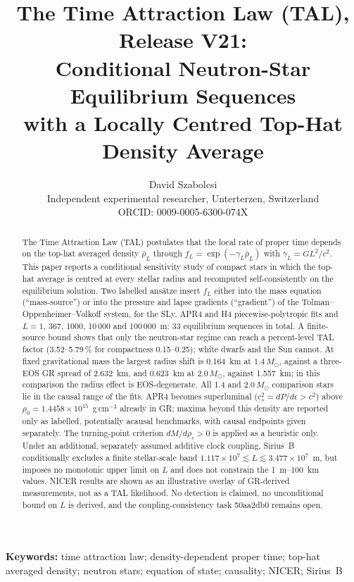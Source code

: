 \documentclass[11pt,a4paper]{article}
\title{\textbf{The Time Attraction Law (TAL), Release V21:\\
Conditional Neutron-Star Equilibrium Sequences\\
with a Locally Centred Top-Hat Density Average}}
\author{David Szabolcsi\\[2pt]
\small Independent experimental researcher, Unterterzen, Switzerland\\[2pt]
\small ORCID: 0009-0005-6300-074X}
\date{}
\newcommand{\Msun}{M_\odot}
\newcommand{\ee}[2]{#1\times10^{#2}}
\begin{document}
\maketitle
\linenumbers

\begin{abstract}
\noindent The Time Attraction Law (TAL) postulates that the local rate of proper time depends on the
top-hat averaged density $\bar\rho_L$ through $f_L=\exp(-\gamma_L\bar\rho_L)$ with $\gamma_L=GL^2/c^2$.
This paper reports a conditional sensitivity study of compact stars in which the top-hat average is
centred at every stellar radius and recomputed self-consistently on the equilibrium solution. Two
labelled ans\"atze insert $f_L$ either into the mass equation (``mass-source'') or into the pressure
and lapse gradients (``gradient'') of the Tolman--Oppenheimer--Volkoff system, for the SLy, APR4 and H4
piecewise-polytropic fits and $L=1$, 367, 1000, 10\,000 and 100\,000~m: 33 equilibrium sequences in total.
A finite-source bound shows that only the neutron-star regime can reach a percent-level TAL factor
(3.52--5.79\,\% for compactness 0.15--0.25); white dwarfs and the Sun cannot. At fixed gravitational
mass the largest radius shift is 0.164~km at $1.4\,\Msun$, against a three-EOS GR spread of 2.632~km,
and 0.623~km at $2.0\,\Msun$, against 1.557~km; in this comparison the radius effect is EOS-degenerate.
All 1.4 and $2.0\,\Msun$ comparison stars lie in the causal range of the fits. APR4 becomes superluminal
($c_s^2=dP/d\epsilon>c^2$) above $\rho_0=\ee{1.4458}{15}$~g\,cm$^{-3}$ already in GR; maxima beyond this
density are reported only as labelled, potentially acausal benchmarks, with causal endpoints given
separately. The turning-point criterion $dM/d\rho_c>0$ is applied as a heuristic only. Under an additional,
separately assumed additive clock coupling, Sirius~B conditionally excludes a finite stellar-scale band
$\ee{1.117}{7}\lesssim L\lesssim\ee{3.477}{7}$~m, but imposes no monotonic upper limit on $L$ and does not
constrain the 1~m--100~km values. NICER results are shown as an illustrative overlay of GR-derived
measurements, not as a TAL likelihood. No detection is claimed, no unconditional bound on $L$ is derived,
and the coupling-consistency task 50aa2db0 remains open.
\end{abstract}

\noindent\textbf{Keywords:} time attraction law; density-dependent proper time; top-hat averaged density;
neutron stars; equation of state; causality; NICER; Sirius~B
\end{document}
